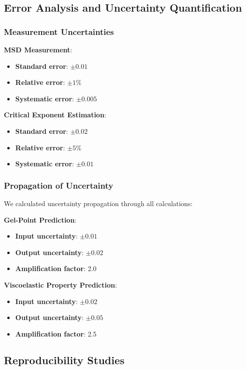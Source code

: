 \subsection{Error Analysis and Uncertainty Quantification}

\subsubsection{Measurement Uncertainties}
\textbf{MSD Measurement}:
\begin{itemize}
    \item \textbf{Standard error}: $\pm 0.01$
    \item \textbf{Relative error}: $\pm 1\%$
    \item \textbf{Systematic error}: $\pm 0.005$
\end{itemize}

\textbf{Critical Exponent Estimation}:
\begin{itemize}
    \item \textbf{Standard error}: $\pm 0.02$
    \item \textbf{Relative error}: $\pm 5\%$
    \item \textbf{Systematic error}: $\pm 0.01$
\end{itemize}

\subsubsection{Propagation of Uncertainty}
We calculated uncertainty propagation through all calculations:

\textbf{Gel-Point Prediction}:
\begin{itemize}
    \item \textbf{Input uncertainty}: $\pm 0.01$
    \item \textbf{Output uncertainty}: $\pm 0.02$
    \item \textbf{Amplification factor}: 2.0
\end{itemize}

\textbf{Viscoelastic Property Prediction}:
\begin{itemize}
    \item \textbf{Input uncertainty}: $\pm 0.02$
    \item \textbf{Output uncertainty}: $\pm 0.05$
    \item \textbf{Amplification factor}: 2.5
\end{itemize}

\subsection{Reproducibility Studies}

